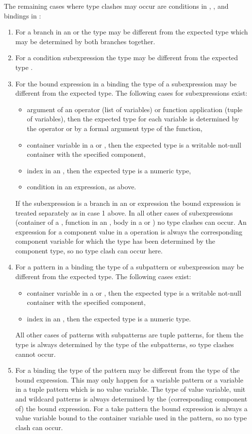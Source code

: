 The remaining cases where type clashes may occur are conditions in , , and bindings in :
\begin{enumerate}
\item For a branch in an  or  the type may be different from the expected type which may be determined
by both branches together.
\item For a condition subexpression the type may be different from the expected type .
\item For the bound expression in a binding the type of a subexpression may be different from the expected type. The following
cases for subexpressions exist:
\begin{itemize}
\item argument of an operator (list of variables) or function application (tuple of variables), then the expected type for
each variable is determined by the operator or by a formal argument type of the function,
\item container variable in a  or , then the expected type is a writable not-null container with
the specified component,
\item index in an , then the expected type is a numeric type,
\item condition in an  expression, as above.
\end{itemize}
If the subexpression is a branch in an  or  expression the bound expression is treated separately
as in case 1 above.
In all other cases of subexpressions (container of a , function in an , body in a  or )
no type clashes can occur. An expression for a component value in a  operation is always the corresponding component
variable for which the type has been determined by the component type, so no type clash can occur here.
\item For a pattern in a binding the type of a subpattern or subexpression may be different from the expected type. The following
cases exist:
\begin{itemize}
\item container variable in a  or , then the expected type is a writable not-null container with
the specified component,
\item index in an , then the expected type is a numeric type.
\end{itemize}
All other cases of patterns with subpatterns are tuple patterns, for them the type is always determined by the type of the
subpatterns, so type clashes cannot occur.
\item For a binding the type of the pattern may be different from the type of the bound expression. This may only happen for
a variable pattern or a variable in a tuple pattern which is no value variable. The type of value variable, unit and wildcard
patterns is always determined by the (corresponding component of) the bound expression. For a take pattern the bound expression
is always a value variable bound to the container variable used in the pattern, so no type clash can occur.
\end{enumerate}

